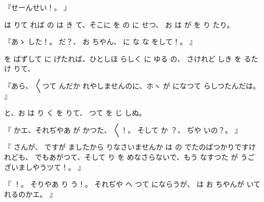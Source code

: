
『せーんせい！。
』

は
りて
れば
の
は
き
て、そこに
を
の
に
せつ、
お
は
が
を
り
たり。

『あゝ
した！。
だ{}？、
お
ちやん、
に
な
な
をして！。
』

を
ばずして
に
げたれば、ひとしほ
らしく
に
ゆる
の、
さけれど
しき
を
るたけ
りて、

『あら、
〳〵つて
んだか
れやしませんのに、ホヽ
が
になつて
らしつたんだは。
』

と、お
は
り
く
を
りて、
つて
を
じ
しぬ。

『
かエ、それぢやあ
が
かつた、
〳〵！。
そして
か
？、
ぢや
いの？。
』

『
さんが、
ですが
ましたから
りなさいませんか
は
の
でたのばつかりですけれども、
でもあがつて、そして
り
を
めなさらないで、もう
なすつた
が
うございましやうツて！。
』

『
！。
そりやあ
り
う！。
それぢや
へ
つて
にならうが、
は
お
ちやんが
いて
れるのかエ。
』

